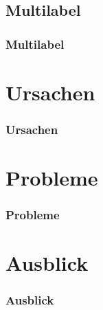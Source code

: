 \documentclass[12pt, xcolor=table]{beamer}
\begin{document}
\subsection{Multilabel} %
\begin{frame}
     \frametitle{Multilabel}
\end{frame}

\section{Ursachen} %
\begin{frame}
    \frametitle{Ursachen}
\end{frame}

\section{Probleme}
\begin{frame}
     \frametitle{Probleme}
\end{frame}

\section{Ausblick} %
\begin{frame}
    \frametitle{Ausblick}
\end{frame}
\end{document}
